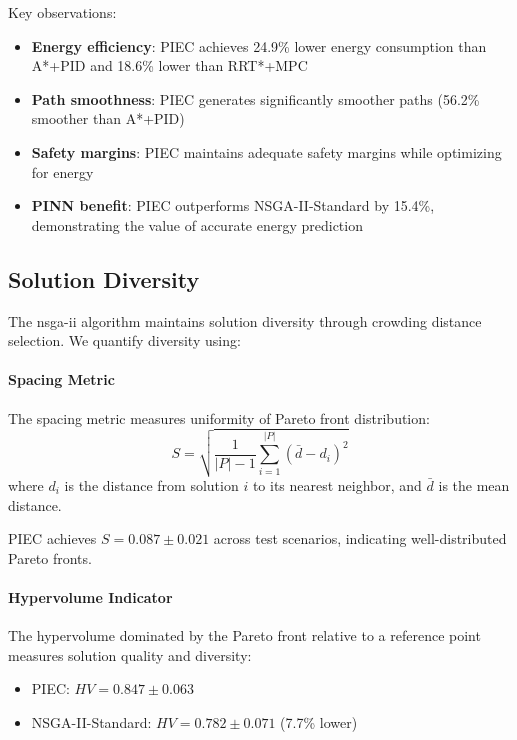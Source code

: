 Key observations:
\begin{itemize}
    \item \textbf{Energy efficiency}: PIEC achieves 24.9\% lower energy consumption than A*+PID and 18.6\% lower than RRT*+MPC
    \item \textbf{Path smoothness}: PIEC generates significantly smoother paths (56.2\% smoother than A*+PID)
    \item \textbf{Safety margins}: PIEC maintains adequate safety margins while optimizing for energy
    \item \textbf{PINN benefit}: PIEC outperforms NSGA-II-Standard by 15.4\%, demonstrating the value of accurate energy prediction
\end{itemize}


\subsection{Solution Diversity}

The \acrshort{nsga-ii} algorithm maintains solution diversity through crowding distance selection. We quantify diversity using:

\paragraph{Spacing Metric}
The spacing metric measures uniformity of Pareto front distribution:
\begin{equation}
S = \sqrt{\frac{1}{|P|-1} \sum_{i=1}^{|P|} (\bar{d} - d_i)^2}
\end{equation}
where $d_i$ is the distance from solution $i$ to its nearest neighbor, and $\bar{d}$ is the mean distance.

PIEC achieves $S = 0.087 \pm 0.021$ across test scenarios, indicating well-distributed Pareto fronts.

\paragraph{Hypervolume Indicator}
The hypervolume dominated by the Pareto front relative to a reference point measures solution quality and diversity:
\begin{itemize}
    \item PIEC: $HV = 0.847 \pm 0.063$
    \item NSGA-II-Standard: $HV = 0.782 \pm 0.071$ (7.7\% lower)
\end{itemize}

